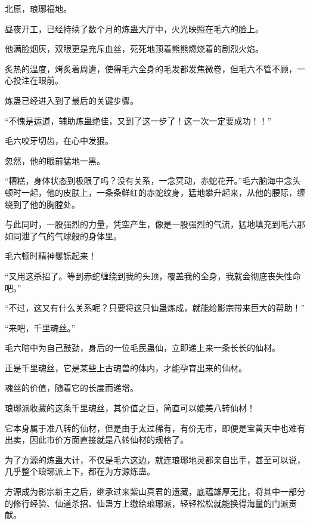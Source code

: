
\begin{this_body}



北原，琅琊福地。

昼夜开工，已经持续了数个月的炼蛊大厅中，火光映照在毛六的脸上。

他满脸烟灰，双眼更是充斥血丝，死死地顶着熊熊燃烧着的剧烈火焰。

炙热的温度，烤炙着周遭，使得毛六全身的毛发都发焦微卷，但毛六不管不顾，一心投注在眼前。

炼蛊已经进入到了最后的关键步骤。

“不愧是运道，辅助炼蛊绝佳，又到了这一步了！这一次一定要成功！！”

毛六咬牙切齿，在心中发狠。

忽然，他的眼前猛地一黑。

“糟糕，身体状态到极限了吗？没有关系，一念冥动，赤蛇花开。”毛六脑海中念头顿时一起，他的皮肤上，一条条鲜红的赤蛇纹身，猛地攀升起来，从他的腰际，缠绕到了他的胸膛处。

与此同时，一股强烈的力量，凭空产生，像是一股强烈的气流，猛地填充到毛六那如同泄了气的气球般的身体里。

毛六顿时精神矍铄起来！

“又用这杀招了。等到赤蛇缠绕到我的头顶，覆盖我的全身，我就会彻底丧失性命吧。”

“不过，这又有什么关系呢？只要将这只仙蛊炼成，就能给影宗带来巨大的帮助！”

“来吧，千里魂丝。”

毛六暗中为自己鼓劲，身后的一位毛民蛊仙，立即递上来一条长长的仙材。

正是千里魂丝，它是某些上古魂兽的体内，才能孕育出来的仙材。

魂丝的价值，随着它的长度而递增。

琅琊派收藏的这条千里魂丝，其价值之巨，简直可以媲美八转仙材！

它本身属于准八转的仙材，但是由于太过稀有，有价无市，即便是宝黄天中也难有出卖，因此市价方面直接就是八转仙材的规格了。

为了方源的炼蛊大计，不仅是毛六这边，就连琅琊地灵都亲自出手，甚至可以说，几乎整个琅琊派上下，都在为方源炼蛊。

方源成为影宗新主之后，继承过来紫山真君的遗藏，底蕴雄厚无比，将其中一部分的修行经验、仙道杀招、仙蛊方上缴给琅琊派，轻轻松松就能换得海量的门派贡献。


\end{this_body}

